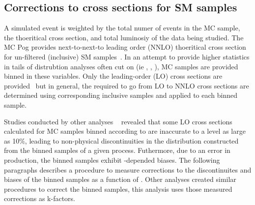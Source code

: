 \subsection{Corrections to cross sections for SM samples\label{sec:k-factors}}

A simulated event is weighted by the total numer of events in the MC sample, 
the thoeritical cross section, and total luminosiy of the data being studied.
The MC Pog provides next-to-next-to leading order (NNLO) thoeritical cross section
for un-filtered (inclusive) SM samples~\cite{twiki-xs}. In an attempt to 
provide higher statistics in tails of distrubtion analyses often cut on 
(ie \partonht, \nparton, \pthat), MC samples are provided binned in these
 variables. Only the leading-order (LO) cross sections are provided~\cite{prep} 
but in general, the \kfactors required to go from LO to NNLO cross sections
are determined using corresponding inclusive samples and applied to each binned sample. 

Studies conducted by other analyses ~\cite{RobXS} revealed that some LO cross
sections calculated for MC samples binned according to \partonht are
inaccurate to a level as large as 10\%, leading to non-physical discontinuities 
in the \partonht distribution constructed from the binned samples of a given process.
Futhermore, due to an error in production, the \wlnu \; \scalht binned samples exhibit 
\scalht-depended biases. The following paragraphs describes a procedure to measure 
corrections to the discontinuites and biases of the \wlnu \; \partonht binned samples 
as a function of \scalht. Other analyses created similar procedures to correct 
the \zmumu \; \partonht binned samples, this analysis uses those measured corrections 
as k-factors.  

